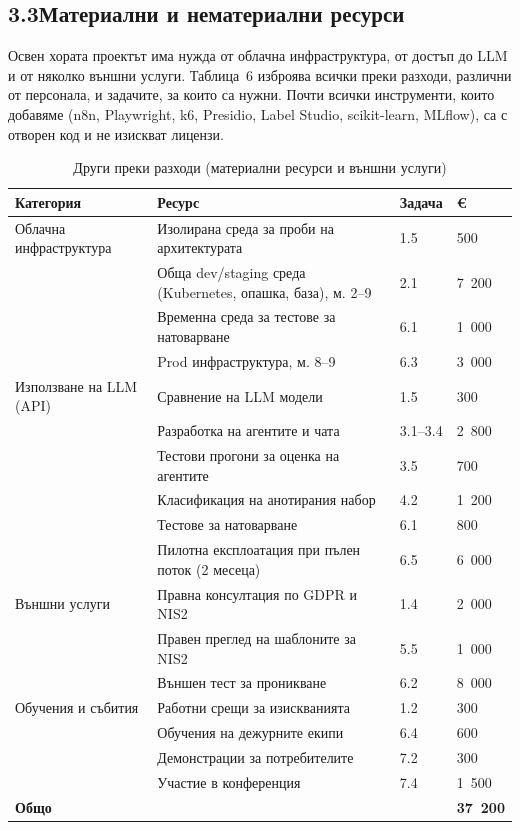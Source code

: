 \documentclass[11pt,a4paper]{article}
\begin{document}
\subsection*{3.3\quad Материални и нематериални ресурси}
Освен хората проектът има нужда от облачна инфраструктура, от достъп до LLM и от няколко външни услуги. Таблица~6 изброява всички преки разходи, различни от персонала, и задачите, за които са нужни. Почти всички инструменти, които добавяме (n8n, Playwright, k6, Presidio, Label Studio, scikit-learn, MLflow), са с отворен код и не изискват лицензи.
{\small
\begin{table}[H]\centering
\caption{Други преки разходи (материални ресурси и външни услуги)}\label{tab:other}
\begin{tabularx}{\textwidth}{@{}l X l R{1.7cm}@{}}
\toprule
\textbf{Категория} & \textbf{Ресурс} & \textbf{Задача} & \textbf{\euro{}}\\
\midrule
Облачна инфраструктура & Изолирана среда за проби на архитектурата & 1.5 & 500\\
 & Обща dev/staging среда (Kubernetes, опашка, база), м. 2--9 & 2.1 & 7~200\\
 & Временна среда за тестове за натоварване & 6.1 & 1~000\\
 & Prod инфраструктура, м. 8--9 & 6.3 & 3~000\\
\addlinespace[2pt]
Използване на LLM (API) & Сравнение на LLM модели & 1.5 & 300\\
 & Разработка на агентите и чата & 3.1--3.4 & 2~800\\
 & Тестови прогони за оценка на агентите & 3.5 & 700\\
 & Класификация на анотирания набор & 4.2 & 1~200\\
 & Тестове за натоварване & 6.1 & 800\\
 & Пилотна експлоатация при пълен поток (2 месеца) & 6.5 & 6~000\\
\addlinespace[2pt]
Външни услуги & Правна консултация по GDPR и NIS2 & 1.4 & 2~000\\
 & Правен преглед на шаблоните за NIS2 & 5.5 & 1~000\\
 & Външен тест за проникване & 6.2 & 8~000\\
\addlinespace[2pt]
Обучения и събития & Работни срещи за изискванията & 1.2 & 300\\
 & Обучения на дежурните екипи & 6.4 & 600\\
 & Демонстрации за потребителите & 7.2 & 300\\
 & Участие в конференция & 7.4 & 1~500\\
\midrule
\textbf{Общо} & & & \textbf{37~200}\\
\bottomrule\end{tabularx}\end{table}}
\end{document}
